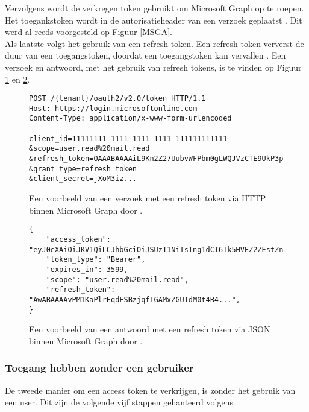 Vervolgens wordt de verkregen token gebruikt om Microsoft Graph op te roepen. Het toegankstoken wordt in de autorisatieheader van een verzoek geplaatst \autocite{Microsoft2023r}. Dit werd al reeds voorgesteld op Figuur \ref{MSGA}. \\

Als laatste volgt het gebruik van een refresh token. Een refresh token ververst de duur van een toegangstoken, doordat een toegangstoken kan vervallen \autocite{Microsoft2023r}. Een verzoek en antwoord, met het gebruik van refresh tokens, is te vinden op Figuur \ref{MSGRTR} en \ref{MSGRTRES}.

\begin{figure}[h!]
    \scriptsize
    \begin{verbatim}
POST /{tenant}/oauth2/v2.0/token HTTP/1.1
Host: https://login.microsoftonline.com
Content-Type: application/x-www-form-urlencoded

client_id=11111111-1111-1111-1111-111111111111
&scope=user.read%20mail.read
&refresh_token=OAAABAAAAiL9Kn2Z27UubvWFPbm0gLWQJVzCTE9UkP3pSx1aXxUjq...
&grant_type=refresh_token
&client_secret=jXoM3iz...   
    \end{verbatim}  
    \caption[Voorbeeld Refresh Token request Microsoft Graph]{Een voorbeeld van een verzoek met een refresh token via \ac{HTTP} binnen Microsoft Graph door \textcite{Microsoft2023r}.}
    \label{MSGRTR}
\end{figure}

\begin{figure}[h!]
    \scriptsize
    \begin{verbatim}
{
    "access_token": "eyJ0eXAiOiJKV1QiLCJhbGciOiJSUzI1NiIsIng1dCI6Ik5HVEZ2ZEstZnl0aEV1Q...",
    "token_type": "Bearer",
    "expires_in": 3599,
    "scope": "user.read%20mail.read",
    "refresh_token": "AwABAAAAvPM1KaPlrEqdFSBzjqfTGAMxZGUTdM0t4B4...",
}    
    \end{verbatim}    
    \caption[Voorbeeld Refresh Token response Microsoft Graph]{Een voorbeeld van een antwoord met een refresh token via \ac{JSON} binnen Microsoft Graph door \textcite{Microsoft2023r}.}
    \label{MSGRTRES}
\end{figure}



\subsubsection{Toegang hebben zonder een gebruiker}

De tweede manier om een access token te verkrijgen, is zonder het gebruik van een user. Dit zijn de volgende vijf stappen gehanteerd volgens \textcite{Microsoft2023s}. \\

